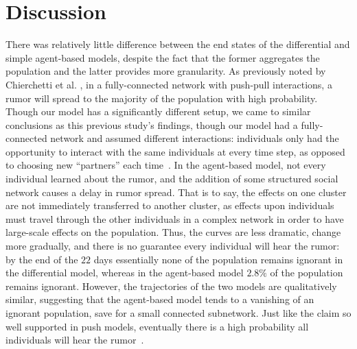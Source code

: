 \section{Discussion }
\label{sec:discussion}

There was relatively little difference between the end states of the differential and simple agent-based models, despite the fact that the former aggregates the population and the latter provides more granularity.
As previously noted by Chierchetti et al.
\cite{chierchetti-2010}, in a fully-connected network with push-pull interactions, a rumor will spread to the majority of the population with high probability.
Though our model has a significantly different setup, we came to similar conclusions as this previous study's findings, though our model had a fully-connected network and assumed different interactions: individuals only had the opportunity to interact with the same individuals at every time step, as opposed to choosing new ``partners'' each time~\cite{chierchetti-2010}.
In the agent-based model, not every individual learned about the rumor, and the addition of some structured social network causes a delay in rumor spread.
That is to say, the effects on one cluster are not immediately transferred to another cluster, as effects upon individuals must travel through the other individuals in a complex network in order to have large-scale effects on the population.
Thus, the curves are less dramatic, change more gradually, and there is no guarantee every individual will hear the rumor: by the end of the $ 22 $ days essentially none of the population remains ignorant in the differential model, whereas in the agent-based model $ 2.8\% $ of the population remains ignorant.
However, the trajectories of the two models are qualitatively similar, suggesting that the agent-based model tends to a vanishing of an ignorant population, save for a small connected subnetwork.
Just like the claim so well supported in push models, eventually there is a high probability all individuals will hear the rumor~\cite{pittel-1987, angelopoulos-2009}.

